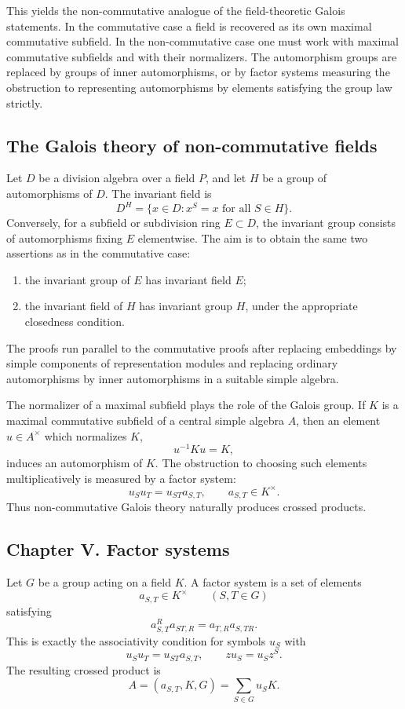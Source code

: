 \documentclass[11pt]{article}
\begin{document}
This yields the non-commutative analogue of the field-theoretic Galois statements. In the commutative case a field is recovered as its own maximal commutative subfield. In the non-commutative case one must work with maximal commutative subfields and with their normalizers. The automorphism groups are replaced by groups of inner automorphisms, or by factor systems measuring the obstruction to representing automorphisms by elements satisfying the group law strictly.

\subsection{The Galois theory of non-commutative fields}

Let \(D\) be a division algebra over a field \(P\), and let \(H\) be a group of automorphisms of \(D\). The invariant field is
\[
  D^H=\{x\in D:x^S=x\text{ for all }S\in H\}.
\]
Conversely, for a subfield or subdivision ring \(E\subset D\), the invariant group consists of automorphisms fixing \(E\) elementwise. The aim is to obtain the same two assertions as in the commutative case:
\begin{enumerate}[label=\arabic*.]
\item the invariant group of \(E\) has invariant field \(E\);
\item the invariant field of \(H\) has invariant group \(H\), under the appropriate closedness condition.
\end{enumerate}
The proofs run parallel to the commutative proofs after replacing embeddings by simple components of representation modules and replacing ordinary automorphisms by inner automorphisms in a suitable simple algebra.

The normalizer of a maximal subfield plays the role of the Galois group. If \(K\) is a maximal commutative subfield of a central simple algebra \(A\), then an element \(u\in A^{\times}\) which normalizes \(K\),
\[
  u^{-1}Ku=K,
\]
induces an automorphism of \(K\). The obstruction to choosing such elements multiplicatively is measured by a factor system:
\[
  u_Su_T=u_{ST}a_{S,T},\qquad a_{S,T}\in K^{\times}.
\]
Thus non-commutative Galois theory naturally produces crossed products.

\subsection{Chapter V. Factor systems}

Let \(G\) be a group acting on a field \(K\). A factor system is a set of elements
\[
  a_{S,T}\in K^{\times}\qquad(S,T\in G)
\]
satisfying
\[
  a_{S,T}^{R}a_{ST,R}=a_{T,R}a_{S,TR}.
\]
This is exactly the associativity condition for symbols \(u_S\) with
\[
  u_Su_T=u_{ST}a_{S,T},
  \qquad z u_S=u_Sz^S.
\]
The resulting crossed product is
\[
  A=(a_{S,T},K,G)=\sum_{S\in G}u_SK.
\]
\end{document}
